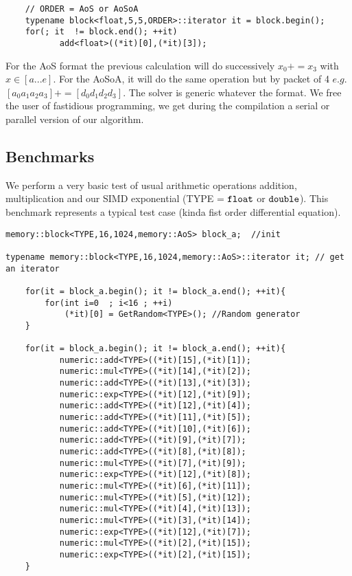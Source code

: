 \documentclass[11pt]{amsart}
\begin{document}
\begin{lstlisting}
    // ORDER = AoS or AoSoA
    typename block<float,5,5,ORDER>::iterator it = block.begin(); 
    for(; it  != block.end(); ++it)
           add<float>((*it)[0],(*it)[3]); 
 \end{lstlisting}
\vspace{0.2cm}
For the AoS format the previous calculation will do successively $x_0 += x_3$ with  $x \in [a...e]$. For the AoSoA, it will do the same operation but by packet of 4 $e.g.$ $[a_0a_1a_2a_3] += [d_0d_1d_2d_3]$.
The solver is generic whatever the format. We free the user of fastidious programming, we get during the compilation a serial or parallel version of our algorithm.

\subsection*{Benchmarks} 

We perform a very basic test of usual arithmetic operations addition, multiplication and our SIMD exponential (TYPE = $\verb+float+$ or $\verb+double+$). This benchmark 
 represents a typical test case (kinda fist order differential equation).

\begin{lstlisting}
memory::block<TYPE,16,1024,memory::AoS> block_a;  //init

typename memory::block<TYPE,16,1024,memory::AoS>::iterator it; // get  an iterator
    
    for(it = block_a.begin(); it != block_a.end(); ++it){
        for(int i=0  ; i<16 ; ++i)
            (*it)[0] = GetRandom<TYPE>(); //Random generator
    }

    for(it = block_a.begin(); it != block_a.end(); ++it){
           numeric::add<TYPE>((*it)[15],(*it)[1]);
           numeric::mul<TYPE>((*it)[14],(*it)[2]);
           numeric::add<TYPE>((*it)[13],(*it)[3]);
           numeric::exp<TYPE>((*it)[12],(*it)[9]);
           numeric::add<TYPE>((*it)[12],(*it)[4]);
           numeric::add<TYPE>((*it)[11],(*it)[5]);
           numeric::add<TYPE>((*it)[10],(*it)[6]);
           numeric::add<TYPE>((*it)[9],(*it)[7]);
           numeric::add<TYPE>((*it)[8],(*it)[8]);
           numeric::mul<TYPE>((*it)[7],(*it)[9]);
           numeric::exp<TYPE>((*it)[12],(*it)[8]);
           numeric::mul<TYPE>((*it)[6],(*it)[11]);
           numeric::mul<TYPE>((*it)[5],(*it)[12]);
           numeric::mul<TYPE>((*it)[4],(*it)[13]);
           numeric::mul<TYPE>((*it)[3],(*it)[14]);
           numeric::exp<TYPE>((*it)[12],(*it)[7]);
           numeric::mul<TYPE>((*it)[2],(*it)[15]);
           numeric::exp<TYPE>((*it)[2],(*it)[15]);
    }

 \end{lstlisting}
\end{document}
